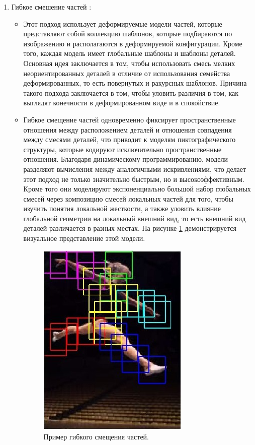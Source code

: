 \begin{enumerate}[label=\arabic*)]
 	\item Гибкое смешение частей \cite{FPE}:
 		
 		\begin{itemize}
 			\item Этот подход использует деформируемые модели частей, которые представляют собой коллекцию шаблонов, которые подбираются по изображению и располагаются в деформируемой конфигурации. 
 			Кроме того, каждая модель имеет глобальные шаблоны и шаблоны деталей. 
 			Основная идея заключается в том, чтобы использовать смесь мелких неориентированных деталей в отличие от использования семейства деформированных, то есть повернутых и ракурсных шаблонов.
 			Причина такого подхода заключается в том, чтобы уловить различия в том, как выглядят конечности в деформированном виде и в спокойствие.
 			
 			\item Гибкое смещение частей одновременно фиксирует пространственные отношения между расположением деталей и отношения совпадения между смесями деталей, что приводит к моделям пиктографического структуры, которые кодируют исключительно пространственные отношения. 
 			Благодаря динамическому программированию, модели разделяют вычисления между аналогичными искривлениями, что делает этот подход не только значительно быстрым, но и высокоэффективным.
 			Кроме того они моделируют экспоненциально большой набор глобальных смесей через композицию смесей локальных частей для того, чтобы изучить понятия локальной жесткости, а также уловить влияние глобальной геометрии на локальный внешний вид, то есть внешний вид деталей различается в разных местах. 
 			На рисунке \ref{img:fpe} демонстрируется визуальное представление этой модели.
 			
 			\begin{figure}[ht!]
 				\centering
 				\includegraphics[width=0.3\linewidth]{assets/fpe.jpeg}
 				\caption{Пример гибкого смещения частей.}
 				\label{img:fpe}
 			\end{figure}
 			

\end{itemize}
\end{enumerate}
